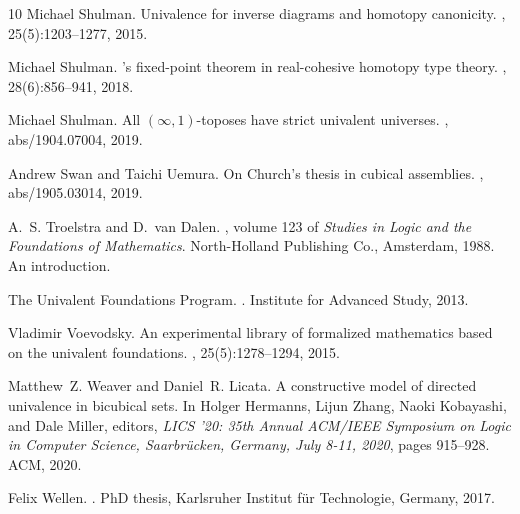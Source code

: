 \documentclass[10pt,a4paper,draft]{article}
\renewcommand{\~}{\widetilde}
\newcounter{diagram}
\theoremstyle{definition}
\theoremstyle{remark} %
\begin{document}
\begin{thebibliography}{10}
Michael Shulman.
\newblock Univalence for inverse diagrams and homotopy canonicity.
, 25(5):1203--1277,
  2015.

Michael Shulman.
's fixed-point theorem in real-cohesive homotopy type
  theory.
, 28(6):856--941,
  2018.

Michael Shulman.
\newblock All $(\infty,1)$-toposes have strict univalent universes.
, abs/1904.07004, 2019.

Andrew Swan and Taichi Uemura.
\newblock On {Church}'s thesis in cubical assemblies.
, abs/1905.03014, 2019.

A.~S. Troelstra and D.~van Dalen.
, volume 123 of {\em
  Studies in Logic and the Foundations of Mathematics}.
\newblock North-Holland Publishing Co., Amsterdam, 1988.
\newblock An introduction.

The {Univalent Foundations Program}.
.
\newblock Institute for Advanced Study, 2013.

Vladimir Voevodsky.
\newblock An experimental library of formalized mathematics based on the
  univalent foundations.
, 25(5):1278--1294,
  2015.

Matthew~Z. Weaver and Daniel~R. Licata.
\newblock A constructive model of directed univalence in bicubical sets.
\newblock In Holger Hermanns, Lijun Zhang, Naoki Kobayashi, and Dale Miller,
  editors, {\em {LICS} '20: 35th Annual {ACM/IEEE} Symposium on Logic in
  Computer Science, Saarbr\"{u}cken, Germany, July 8-11, 2020}, pages 915--928.
  {ACM}, 2020.

Felix Wellen.
.
\newblock PhD thesis, Karlsruher Institut für Technologie, Germany, 2017.

\end{thebibliography}

%
\end{document}
